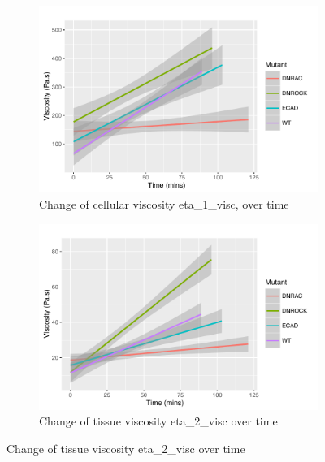  \begin{figure}
 \centering
 \hfill
  \begin{subfigure}[t]{1\linewidth}
   \centering
   \includegraphics{Chapters/tweezers/Figs/PDF/Cells_-_Time}
   \caption{Change of cellular viscosity \gls{eta_1_visc}, over time}
   \label{fig:cells_time}
  \end{subfigure}\hfill
   \begin{subfigure}[t]{1\linewidth}
    \centering
    \includegraphics{Chapters/tweezers/Figs/PDF/Tissue_-_Time}
    \caption{Change of tissue viscosity \gls{eta_2_visc} over time}
    \label{fig:tissue_time}
   \end{subfigure}\hfill
\end{figure}
